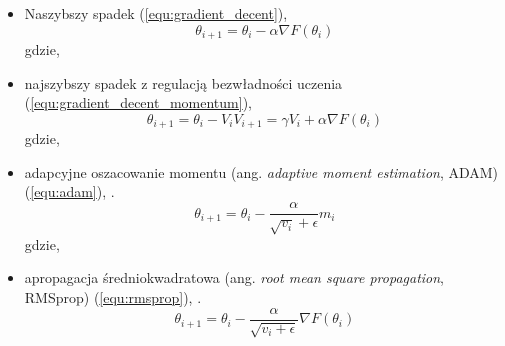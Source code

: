 {\begin{itemize}
\item Naszybszy spadek (\ref{equ:gradient_decent}),
\begin{equation}
\theta_{i+1} = \theta_i - \alpha \nabla F(\theta_i)
\label{equ:gradient_decent}
\end{equation}
gdzie,
\item najszybszy spadek z regulacją bezwładności uczenia (\ref{equ:gradient_decent_momentum}),
\begin{equation}
\theta_{i+1} = \theta_i - V_i
V_{i+1} = \gamma V_i + \alpha \nabla F(\theta_i)
\label{equ:gradient_decent_momentum}
\end{equation}
gdzie,
\item adapcyjne oszacowanie momentu (ang. \textit{adaptive moment estimation}, ADAM) (\ref{equ:adam}), \cite{Kingma2014AdamAM}.
\begin{equation}
\theta_{i+1} = \theta_i - \frac{\alpha}{\sqrt{v_i} + \epsilon} m_i
\label{equ:adam}
\end{equation}
gdzie,
\item apropagacja średniokwadratowa (ang. \textit{root mean square propagation}, RMSprop) (\ref{equ:rmsprop}), \cite{Kurbiel2017TrainingOD}.
\begin{equation}
\theta_{i+1} = \theta_i - \frac{\alpha}{\sqrt{v_i + \epsilon}} \nabla F(\theta_i)
\label{equ:rmsprop}
\end{equation}
\end{itemize}

}
